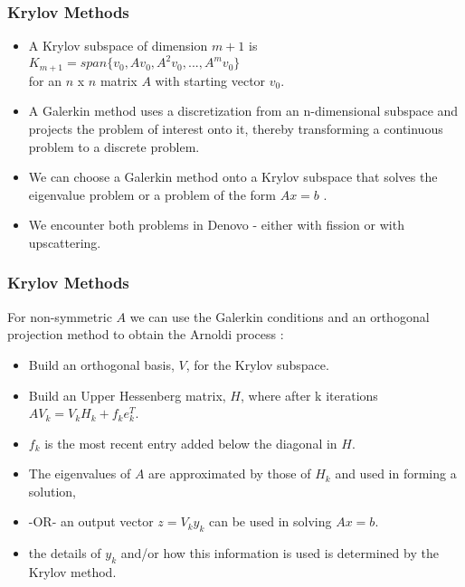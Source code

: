 \documentclass{beamer}
\begin{document}
\begin{frame}
  \frametitle{Krylov Methods}
  
  \begin{itemize}
    \item A Krylov subspace of dimension $m + 1$ is $K_{m+1}  =span\{v_0, Av_0, A^2v_0,..., A^mv_0\}$ \\
    for an $n$ x $n$ matrix $A$ with starting vector $v_{0}$. \\
    \item A Galerkin method uses a discretization from an n-dimensional subspace and projects the problem of interest onto it, thereby transforming a continuous problem to a discrete problem.\\
    \item We can choose a Galerkin method onto a Krylov subspace that solves the eigenvalue problem or a problem of the form $Ax = b$ \cite{gmres}.\\
    \item We encounter both problems in Denovo - either with fission or with upscattering.
 \end{itemize}
  
\end{frame}    

\begin{frame}
  \frametitle{Krylov Methods}
      
For non-symmetric $A$ we can use the Galerkin conditions and an orthogonal projection method to obtain the Arnoldi process \cite{gmres}:\\
    \begin {itemize}
      \item Build an orthogonal basis, $V$, for the Krylov subspace.\\
      \item Build an Upper Hessenberg matrix, $H$, where after k iterations $AV_{k} = V_{k}H_{k} + f_{k}e_{k}^{T}$.
      \item $f_{k}$ is the most recent entry added below the diagonal in $H$. 
      \item The eigenvalues of $A$ are approximated by those of $H_{k}$ and used in forming a solution,
      \item -OR- an output vector $z = V_{k}y_{k}$ can be used in solving $Ax = b$.
      \item the details of $y_{k}$ and/or how this information is used is determined by the Krylov method.
    \end{itemize}

 
\end{frame}
\end{document}
